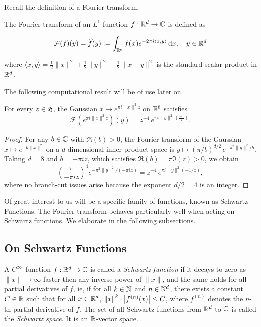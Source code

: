 Recall the definition of a Fourier transform.

\begin{definition}\label{def:Fourier-Transform}\leanok
  The Fourier transform of an $L^1$-function $f:\mathbb{R}^d\to\mathbb{C}$ is defined as

  \[
    \mathcal{F}(f)(y) = \widehat{f}(y) := \int_{\mathbb{R}^d} f(x)e^{-2\pi i \langle x, y \rangle} \,\mathrm{d}x, \quad y \in \mathbb{R}^d
  \]

  where $\langle x, y \rangle = \frac12\|x\|^2 + \frac12\|y\|^2 - \frac12\|x - y\|^2$ is the standard scalar product in $\mathbb{R}^d$.
\end{definition}

The following computational result will be of use later on.

\begin{lemma}\label{lemma:Gaussian-Fourier}\leanok
  For every $z \in \mathfrak{H}$, the Gaussian $x \mapsto e^{\pi i \|x\|^2 z}$ on $\mathbb{R}^8$ satisfies
  \begin{equation}
    \mathcal{F}(e^{\pi i \|x\|^2 z})(y) = z^{-4}\,e^{\pi i \|y\|^2 \,(\frac{-1}{z}) }.
  \end{equation}
\end{lemma}
\begin{proof}\leanok
  For any $b \in \mathbb{C}$ with $\Re(b) > 0$, the Fourier transform of the Gaussian $x \mapsto e^{-b\|x\|^2}$ on a $d$-dimensional inner product space is $y \mapsto (\pi/b)^{d/2}\,e^{-\pi^2\|y\|^2/b}$. Taking $d = 8$ and $b = -\pi i z$, which satisfies $\Re(b) = \pi \Im(z) > 0$, we obtain
  \[
    \left(\frac{\pi}{-\pi i z}\right)^{4} e^{-\pi^2\|y\|^2/(-\pi i z)}
    = z^{-4}\, e^{\pi i \|y\|^2(-1/z)},
  \]
  where no branch-cut issues arise because the exponent $d/2 = 4$ is an integer.
\end{proof}

Of great interest to us will be a specific family of functions, known as Schwartz Functions. The Fourier transform behaves particularly well when acting on Schwartz functions. We elaborate in the following subsections.

\subsection{On Schwartz Functions}

\begin{definition}\label{def:Schwartz-Space}\leanok
A $C^\infty$~function $f:\mathbb{R}^d\to\mathbb{C}$ is called a \emph{Schwartz function} if it decays to zero as $\|x\|\to\infty$ faster then any inverse power of $\|x\|$, and the same holds for all partial derivatives of $f$, ie, if for all $k \in \mathbb{N}$ and $n \in \mathbb{N}^d$, there exists a constant $C \in \mathbb{R}$ such that for all $x \in \mathbb{R}^d$, $\left\lVert x \right\rVert^k \cdot \left\lvert f^{(n)}(x) \right\rvert \leq C$, where $f^{(n)}$ denotes the $n$-th partial derivative of $f$. The set of all Schwartz functions from $\mathbb{R}^d$ to $\mathbb{C}$ is called the \emph{Schwartz space}. It is an $\mathbb{R}$-vector space.
\end{definition}

